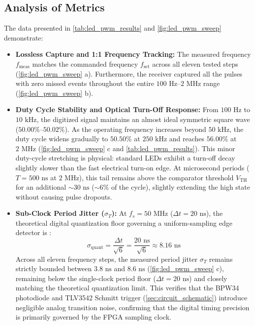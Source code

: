\subsection{Analysis of Metrics}
The data presented in \cref{tab:led_pwm_results} and \cref{fig:led_pwm_sweep} demonstrate:
\begin{itemize}
    \item \textbf{Lossless Capture and 1:1 Frequency Tracking:} The measured frequency $f_{\text{meas}}$ matches the commanded frequency $f_{\text{set}}$ across all eleven tested steps (\cref{fig:led_pwm_sweep} a). Furthermore, the receiver captured all the pulses with zero missed events throughout the entire $100\text{ Hz}\text{--}2\text{ MHz}$ range (\cref{fig:led_pwm_sweep} b).
    
    \item \textbf{Duty Cycle Stability and Optical Turn-Off Response:} From $100\text{ Hz}$ to $10\text{ kHz}$, the digitized signal maintains an almost ideal symmetric square wave ($50.00\%\text{--}50.02\%$). As the operating frequency increases beyond $50\text{ kHz}$, the duty cycle widens gradually to $50.50\%$ at $250\text{ kHz}$ and reaches $56.00\%$ at $2\text{ MHz}$ (\cref{fig:led_pwm_sweep} c and \cref{tab:led_pwm_results}). This minor duty-cycle stretching is physical: standard LEDs exhibit a turn-off decay slightly slower than the fast electrical turn-on edge. At microsecond periods ($T = 500\text{ ns}$ at $2\text{ MHz}$), this tail remains above the comparator threshold $V_{\text{TH}}$ for an additional $\sim 30\text{ ns}$ ($\sim 6\%$ of the cycle), slightly extending the high state without causing pulse dropouts.
    
    \item \textbf{Sub-Clock Period Jitter ($\sigma_T$):} At $f_s = 50\text{ MHz}$ ($\Delta t = 20\text{ ns}$), the theoretical digital quantization floor governing a uniform-sampling edge detector is \cite[Chap 4.]{widrowQuantizationNoiseRoundoff2008}:
    \begin{equation}
        \sigma_{\text{quant}} = \frac{\Delta t}{\sqrt{6}} = \frac{20\text{ ns}}{\sqrt{6}} \approx 8.16\text{ ns}
    \end{equation}
    Across all eleven frequency steps, the measured period jitter $\sigma_T$ remains strictly bounded between $3.8\text{ ns}$ and $8.6\text{ ns}$ (\cref{fig:led_pwm_sweep} c), remaining below the single-clock period floor ($\Delta t = 20\text{ ns}$) and closely matching the theoretical quantization limit. This verifies that the BPW34 photodiode and TLV3542 Schmitt trigger (\cref{sec:circuit_schematic}) introduce negligible analog transition noise, confirming that the digital timing precision is primarily governed by the FPGA sampling clock.
\end{itemize}

